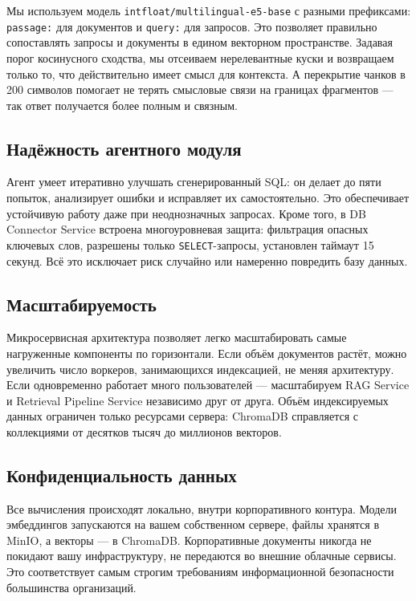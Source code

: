 Мы используем модель \texttt{intfloat/multilingual-e5-base} с разными префиксами: \texttt{passage:} для документов и \texttt{query:} для запросов. Это позволяет правильно сопоставлять запросы и документы в едином векторном пространстве. Задавая порог косинусного сходства, мы отсеиваем нерелевантные куски и возвращаем только то, что действительно имеет смысл для контекста. А перекрытие чанков в 200 символов помогает не терять смысловые связи на границах фрагментов — так ответ получается более полным и связным.

\subsection{Надёжность агентного модуля}

Агент умеет итеративно улучшать сгенерированный SQL: он делает до пяти попыток, анализирует ошибки и исправляет их самостоятельно. Это обеспечивает устойчивую работу даже при неоднозначных запросах. Кроме того, в DB Connector Service встроена многоуровневая защита: фильтрация опасных ключевых слов, разрешены только \texttt{SELECT}-запросы, установлен таймаут 15 секунд. Всё это исключает риск случайно или намеренно повредить базу данных.

\subsection{Масштабируемость}

Микросервисная архитектура позволяет легко масштабировать самые нагруженные компоненты по горизонтали. Если объём документов растёт, можно увеличить число воркеров, занимающихся индексацией, не меняя архитектуру. Если одновременно работает много пользователей — масштабируем RAG Service и Retrieval Pipeline Service независимо друг от друга. Объём индексируемых данных ограничен только ресурсами сервера: ChromaDB справляется с коллекциями от десятков тысяч до миллионов векторов.

\subsection{Конфиденциальность данных}

Все вычисления происходят локально, внутри корпоративного контура. Модели эмбеддингов запускаются на вашем собственном сервере, файлы хранятся в MinIO, а векторы — в ChromaDB. Корпоративные документы никогда не покидают вашу инфраструктуру, не передаются во внешние облачные сервисы. Это соответствует самым строгим требованиям информационной безопасности большинства организаций.